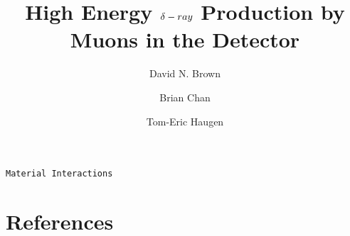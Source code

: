 \documentclass[review]{elsarticle}
\def\deltaray{\ensuremath{{\rm \delta}-ray}\xspace}
\begin{document}
\begin{frontmatter}

\title{High Energy \deltaray Production by Muons in the \lbabar \xspace Detector}

\author[LBLaddress]{David N. Brown}
\author[LBLaddress]{Brian Chan}
\author[LBLaddress]{Tom-Eric Haugen}
\address[LBLaddress]{Lawrence Berkeley National Lab}



\begin{keyword}
\texttt{Material Interactions}
\end{keyword}

\end{frontmatter}

\linenumbers















\section*{References}


\end{document}

